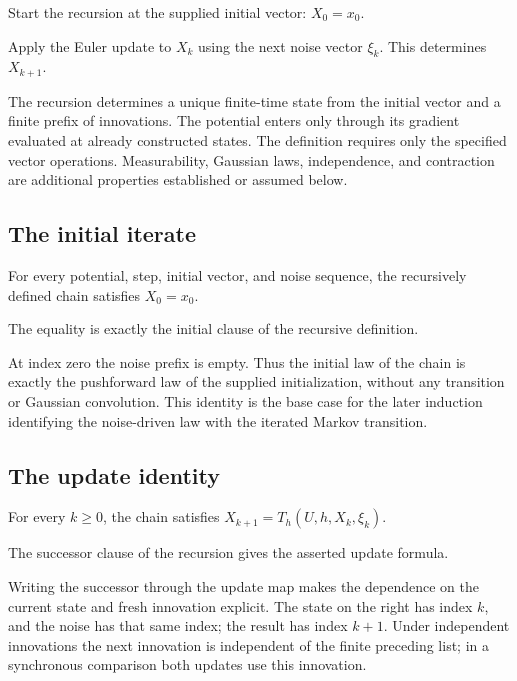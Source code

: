 \documentclass[11pt,a4paper]{article}
\begin{document}
Start the recursion at the supplied initial vector: \(X_0=x_0\).



Apply the Euler update to \(X_k\) using the next noise vector \(\xi_k\). This determines \(X_{k+1}\).



The recursion determines a unique finite-time state from the initial vector and a finite prefix of innovations. The potential enters only through its gradient evaluated at already constructed states. The definition requires only the specified vector operations. Measurability, Gaussian laws, independence, and contraction are additional properties established or assumed below.


\subsection{\texorpdfstring{The initial iterate}{The initial iterate}}


For every potential, step, initial vector, and noise sequence, the recursively defined chain satisfies \(X_0=x_0\).



The equality is exactly the initial clause of the recursive definition.



At index zero the noise prefix is empty. Thus the initial law of the chain is exactly the pushforward law of the supplied initialization, without any transition or Gaussian convolution. This identity is the base case for the later induction identifying the noise-driven law with the iterated Markov transition.


\subsection{\texorpdfstring{The update identity}{The update identity}}


For every \(k\ge0\), the chain satisfies \(X_{k+1}=T_h(U,h,X_k,\xi_k)\).



The successor clause of the recursion gives the asserted update formula.



Writing the successor through the update map makes the dependence on the current state and fresh innovation explicit. The state on the right has index \(k\), and the noise has that same index; the result has index \(k+1\). Under independent innovations the next innovation is independent of the finite preceding list; in a synchronous comparison both updates use this innovation.
\end{document}
